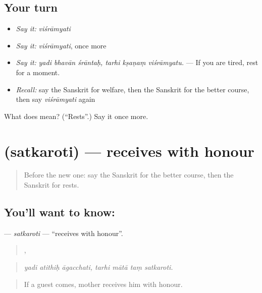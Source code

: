 \subsection*{Your turn}
\begin{itemize}
\raggedright
  \item \emph{Say it:} \emph{viśrāmyati}
  \item \emph{Say it:} \emph{viśrāmyati}, once more
  \item \emph{Say it:} \emph{yadi bhavān śrāntaḥ, tarhi kṣaṇaṃ viśrāmyatu.} — If you are tired, rest for a moment.
  \item \emph{Recall:} say the Sanskrit for welfare, then the Sanskrit for the better course, then say \emph{viśrāmyati} again
\end{itemize}

\begin{tcolorbox}[breakable,colback=teal!4,colframe=teal!35!black,title={Before you move on}]
What does  mean? (\textquotedblleft{}Rests\textquotedblright{}.) Say it once more.
\end{tcolorbox}
\section[\texorpdfstring{\sk{सत्करोति} (satkaroti)}{सत्करोति (satkaroti)}]{ (satkaroti) — receives with honour}

\label{lesson:SA-C382-satkaroti}



\begin{quote}
Before the new one: say the Sanskrit for the better course, then the Sanskrit for rests.
\end{quote}

\subsection*{You'll want to know: }
\textbf{} — \emph{satkaroti} — \textquotedblleft{}receives with honour\textquotedblright{}.

\begin{quote}
  ,    
\end{quote}

\begin{quote}
\emph{yadi atithiḥ āgacchati, tarhi mātā taṃ satkaroti.}
\end{quote}

\begin{quote}
If a guest comes, mother receives him with honour.
\end{quote}

